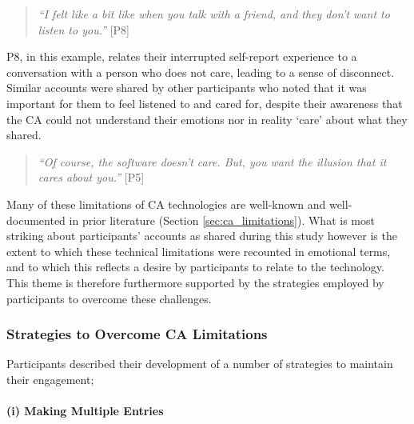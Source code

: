                 \begin{quote}
                \vspace{2mm}
                    \textit{``I felt like a bit like when you talk with a friend, and they don't want to listen to you.''} [P8]
                \vspace{2mm}
                \end{quote}
                
            P8, in this example, relates their interrupted self-report experience to a conversation with a person who does not care, leading to a sense of disconnect. Similar accounts were shared by other participants who noted that it was important for them to feel listened to and cared for, despite their awareness that the \ac{CA} could not understand their emotions nor in reality `care' about what they shared.
            
                \begin{quote}
                \vspace{2mm}
                    \textit{``Of course, the software doesn't care. But, you want the illusion that it cares about you.''} [P5]
                \vspace{2mm}
                \end{quote}
            
            Many of these limitations of CA technologies are well-known and well-documented in prior literature (Section \ref{sec:ca_limitations}). What is most striking about participants' accounts as shared during this study however is the extent to which these technical limitations were recounted in emotional terms, and to which this reflects a desire by participants to relate to the technology. This theme is therefore furthermore supported by the strategies employed by participants to overcome these challenges.
  
        \subsubsection{Strategies to Overcome \ac{CA} Limitations}\label{sec:strategies_to_overcome}
        
            Participants described their development of a number of strategies to maintain their engagement;
            
            \paragraph{(i) Making Multiple Entries} %
        
